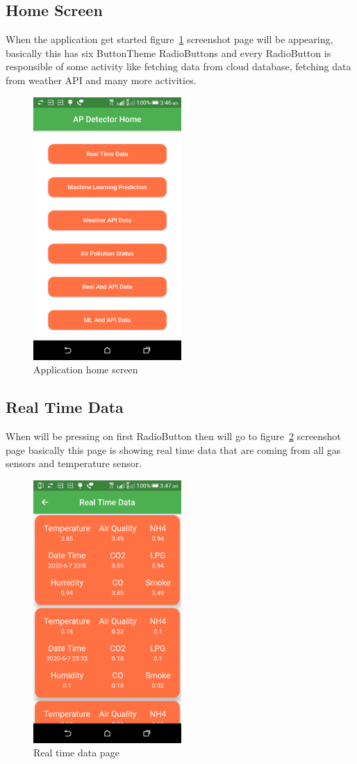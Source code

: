 \subsection{Home Screen}
When the application get started figure~\ref{img414} screenshot page will be appearing, basically this has six ButtonTheme RadioButtons and every RadioButton is responsible of some activity like fetching data from cloud database, fetching data from weather API and many more activities.
\begin{figure}[!ht]
\centering
\includegraphics[height=10cm]{figures/home-screen.png}
\caption{\label{img414} Application home screen}
\end{figure}

\subsection{Real Time Data}
When will be pressing on first RadioButton then will go to figure~\ref{img415} screenshot page basically this page is showing real time data that are coming from all gas sensors and temperature sensor.

\begin{figure}[!ht]
\centering
\includegraphics[height=10cm]{figures/real-data.png}
\caption{\label{img415} Real time data page}
\end{figure}

